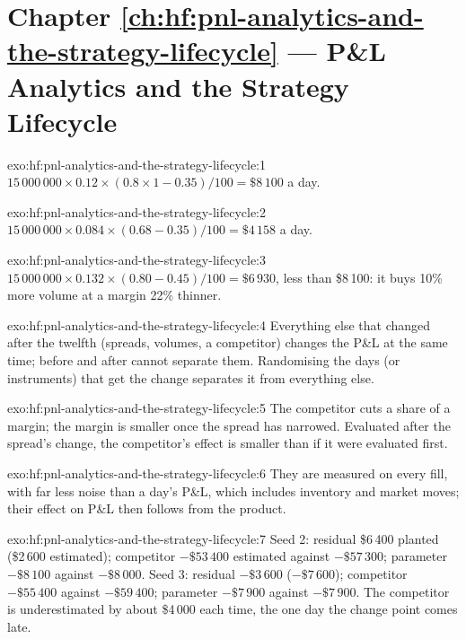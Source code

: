 \section*{Chapter \ref{ch:hf:pnl-analytics-and-the-strategy-lifecycle} --- P\&L Analytics and the Strategy Lifecycle}

\begin{solution}{exo:hf:pnl-analytics-and-the-strategy-lifecycle:1}
$15\,000\,000\times0.12\times(0.8\times1-0.35)/100=\$8\,100$ a day.
\end{solution}

\begin{solution}{exo:hf:pnl-analytics-and-the-strategy-lifecycle:2}
$15\,000\,000\times0.084\times(0.68-0.35)/100=\$4\,158$ a day.
\end{solution}

\begin{solution}{exo:hf:pnl-analytics-and-the-strategy-lifecycle:3}
$15\,000\,000\times0.132\times(0.80-0.45)/100=\$6\,930$, less than \$8\,100: it buys 10\% more volume at a margin 22\% thinner.
\end{solution}

\begin{solution}{exo:hf:pnl-analytics-and-the-strategy-lifecycle:4}
Everything else that changed after the twelfth (spreads, volumes, a competitor) changes the P\&L at the same time; before and after cannot separate
them. Randomising the days (or instruments) that get the change separates it from everything else.
\end{solution}

\begin{solution}{exo:hf:pnl-analytics-and-the-strategy-lifecycle:5}
The competitor cuts a share of a margin; the margin is smaller once the spread has narrowed. Evaluated after the spread's change, the competitor's
effect is smaller than if it were evaluated first.
\end{solution}

\begin{solution}{exo:hf:pnl-analytics-and-the-strategy-lifecycle:6}
They are measured on every fill, with far less noise than a day's P\&L, which includes inventory and market moves; their effect on P\&L then follows
from the product.
\end{solution}

\begin{solution}{exo:hf:pnl-analytics-and-the-strategy-lifecycle:7}
Seed 2: residual \$6\,400 planted (\$2\,600 estimated); competitor $-\$53\,400$ estimated against $-\$57\,300$; parameter $-\$8\,100$ against $-\$8\,000$.
Seed 3: residual $-\$3\,600$ ($-\$7\,600$); competitor $-\$55\,400$ against $-\$59\,400$; parameter $-\$7\,900$ against $-\$7\,900$. The competitor is
underestimated by about \$4\,000 each time, the one day the change point comes late.
\end{solution}


